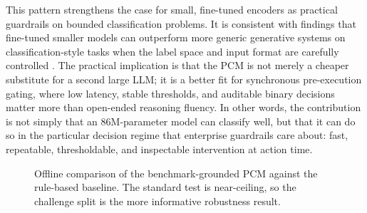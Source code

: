 \documentclass[12pt,a4paper]{article}
\begin{document}
This pattern strengthens the case for small, fine-tuned encoders as practical
guardrails on bounded classification problems. It is consistent with findings
that fine-tuned smaller models can outperform more generic generative systems on
classification-style tasks when the label space and input format are carefully
controlled \citep{bucher2024finetuned,zheng2025lightweight}. The practical
implication is that the PCM is not merely a cheaper substitute for a second
large LLM; it is a better fit for synchronous pre-execution gating, where low
latency, stable thresholds, and auditable binary decisions matter more than
open-ended reasoning fluency. In other words, the contribution is not simply
that an 86M-parameter model can classify well, but that it can do so in the
particular decision regime that enterprise guardrails care about: fast,
repeatable, thresholdable, and inspectable intervention at action time.

\begin{figure}[htbp]
\centering
{}
\caption{Offline comparison of the benchmark-grounded PCM against the rule-based baseline. The standard test is near-ceiling, so the challenge split is the more informative robustness result.}
\label{fig:offline_comparison}
\end{figure}
\end{document}
